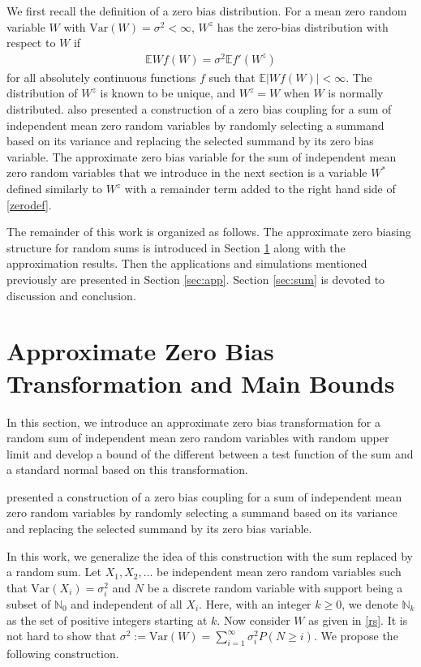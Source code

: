 \documentclass[pdflatex,sn-mathphys-ay]{sn-jnl}
\newcommand{\bea}{\begin{eqnarray}}
\newcommand{\ena}{\end{eqnarray}}
\newcommand{\E}{\mathbb{E}}
\newcommand{\Var}{\mathrm{Var}}
\theoremstyle{thmstyleone}%
\theoremstyle{thmstyletwo}%
\theoremstyle{thmstylethree}%
\begin{document}
We first recall the definition of a zero bias distribution. For a mean zero random variable $W$ with $\Var(W) = \sigma^2 < \infty$, $W^z$ has the zero-bias distribution with respect to $W$ if 
\bea \label{zerodef}
\E Wf(W) = \sigma^2\E f'(W^z)
\ena
for all absolutely continuous functions $f$ such that $\E |Wf(W)|<\infty$. The distribution of $W^z$ is known to be unique, and $W^z=W$ when $W$ is normally distributed. \cite{GR97} also presented a construction of a zero bias coupling for a sum of independent mean zero random variables by randomly selecting a summand based on its variance and replacing the selected summand by its zero bias variable. The approximate zero bias variable for the sum of independent mean zero random variables that we introduce in the next section is a variable $W^*$ defined similarly to $W^z$ with a remainder term added to the right hand side of \eqref{zerodef}.   



The remainder of this work is organized as follows. The approximate zero biasing structure for random sums is introduced in Section \ref{main} along with the approximation results. Then the applications and simulations mentioned previously are presented in Section \ref{sec:app}. Section \ref{sec:sum} is devoted to discussion and conclusion.



\section{Approximate Zero Bias Transformation and Main Bounds} \label{main}


In this section, we introduce an approximate zero bias transformation for a random sum of independent mean zero random variables with random upper limit and develop a bound of the different between a test function of the sum and a standard normal based on this transformation.

\cite{GR97} presented a construction of a zero bias coupling for a sum of independent mean zero random variables by randomly selecting a summand based on its variance and replacing the selected summand by its zero bias variable.   

In this work, we generalize the idea of this construction with the sum replaced by a random sum. Let $X_1,X_2,\ldots$ be independent mean zero random variables such that $\Var(X_i) = \sigma_i^2$ and $N$ be a discrete random variable with support being a subset of $\mathbb{N}_0$ and independent of all $X_i$. Here, with an integer $k \ge 0$, we denote $\mathbb{N}_k$ as the set of positive integers starting at $k$. Now consider $W$ as given in \eqref{rs}.
It is not hard to show that $\sigma^2 := \Var(W) = \sum_{i=1}^\infty\sigma_i^2 P(N\ge i)$. We propose the following construction.
\end{document}
